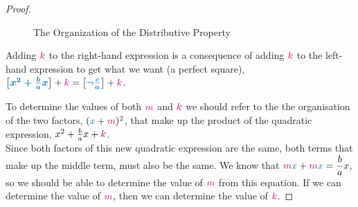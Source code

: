 \documentclass[20150903-160354-rs2.2-MarksMathNotebook.tex]{subfiles}
\begin{document}
\begin{proof}
\begin{figure}[h!]
\begin{center}
\caption{The Organization of the Distributive Property}
\end{center}
\end{figure}

Adding $\cRed{k}$ to the right-hand expression is a consequence of adding $\cRed{k}$ to the left-hand expression to get what we want (a perfect square), $\farg{x^2 +\frac{b}{a}x}+\cRed{k} = \farg{\neg \frac{c}{a}}+\cRed{k}$.  

To determine the values of both $\cRed{m}$ and $\cRed{k}$ we should refer to the the organisation of the two factors, $(\cBlue{x}+\cRed{m})^2$, that make up the product of the quadratic expression, $x^2 +\frac{b}{a}x+\cRed{k}$.\\

Since both factors of this new quadratic expression are the same, both terms that make up the middle term,  must also be the same.  We know that $\cRed{m}\cBlue{x} + \cRed{m}\cBlue{x}=\dfrac{b}{a}x$, so we should be able to determine the value of $\cRed{m}$ from this equation.    If we can determine the value of $\cRed{m}$, then we can determine the value of  $\cRed{k}$.


\end{proof}
\end{document}
